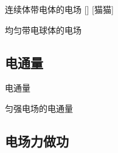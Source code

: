 \documentclass[UTF8]{ctexart}
\begin{document}
        \begin{ppt}
            []
            {连续体带电体的电场}
            []
            [猫猫]
        \end{ppt}
        
        \begin{xmp}
            {均匀带电球体的电场}
        \end{xmp}

    \subsection{电通量}
        
        \begin{dfn}
            {电通量}
        \end{dfn}
        
        \begin{ppt}
            {匀强电场的电通量}
        \end{ppt}

    \subsection{电场力做功}
\end{document}
